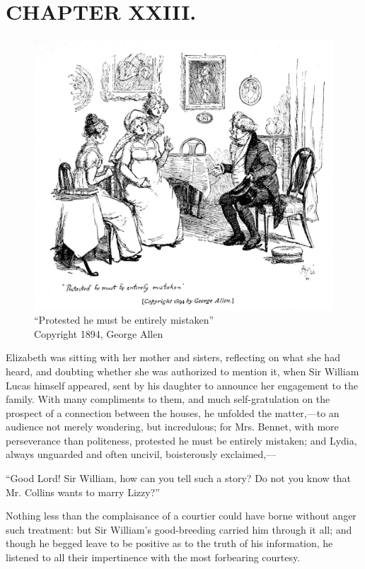 \chapter{CHAPTER XXIII.}

\begin{figure}[htbp]
    \centering
    \includegraphics[width=\textwidth]{illustrations/i_190_a.jpg}
    \caption{“Protested he must be entirely mistaken”\\ Copyright 1894, George Allen}
    \label{fig:image}
\end{figure}


Elizabeth was sitting with her mother and sisters, reflecting on what she had heard, and doubting whether she was authorized to mention it, when Sir William Lucas himself appeared, sent by his daughter to announce her engagement to the family. With many compliments to them, and much self-gratulation on the prospect of a connection between the houses, he unfolded the matter,---to an audience not merely wondering, but incredulous; for Mrs. Bennet, with more perseverance than politeness, protested he must be entirely mistaken; and Lydia, always unguarded and often uncivil, boisterously exclaimed,---

``Good Lord! Sir William, how can you tell such a story? Do not you know that Mr. Collins wants to marry Lizzy?''

Nothing less than the complaisance of a courtier could have borne without anger such treatment: but Sir William's good-breeding carried him through it all; and though he begged leave to be positive as to the truth of his information, he listened to all their impertinence with the most forbearing courtesy.

